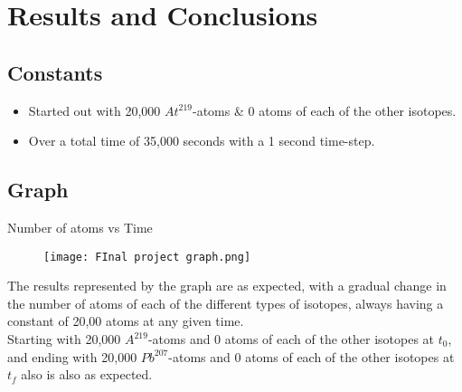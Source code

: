 \documentclass[12pt, letterpaper, twoside]{article}
\begin{document}
\section{Results and Conclusions}
\subsection*{Constants}
\begin{itemize}
 \item Started out with 20,000 $At^{219}$-atoms \& 0 atoms of each of the other isotopes.
 \item Over a total time of 35,000 seconds with a 1 second time-step.
\end{itemize}

\subsection{Graph}
\hspace{7cm} Number of atoms vs Time  
\begin{figure}[hbt!]
    \texttt{[image: FInal project graph.png]}  
\end{figure}

The results represented by the graph are as expected,  with a gradual change in the number of atoms of each of the different types of isotopes, always having a constant of 20,00 atoms at any given time. \\ Starting with 20,000 $A^{219}$-atoms and 0 atoms of each of the other isotopes at $t_0$, and ending with 20,000 $Pb^{207}$-atoms and 0 atoms of each of the other isotopes at $t_f$ also is also as expected. \\
\end{document}

